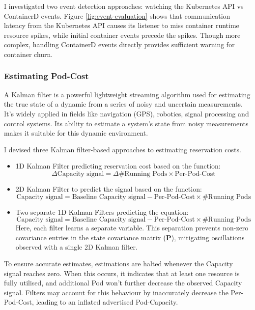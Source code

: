 I investigated two event detection approaches: watching the Kubernetes API vs
ContainerD events. Figure \ref{fig:event-evaluation} shows that communication
latency from the Kubernetes API causes its listener to miss container runtime
resource spikes, while initial container events precede the spikes. Though more
complex, handling ContainerD events directly provides sufficient warning for
container churn.

\subsubsection{Estimating Pod-Cost}
\label{sec:estimating-cost}
A Kalman filter \cite{welch1995introduction} is a powerful lightweight streaming algorithm used for
estimating the true state of a dynamic from a series of noisy and uncertain
measurements. It's widely applied in fields like navigation (GPS), robotics,
signal processing and control systems. Its ability to estimate a system's state
from noisy measurements makes it suitable for this dynamic environment.

I devised three Kalman filter-based approaches to estimating reservation costs.
\begin{itemize}
    \item 1D Kalman Filter predicting reservation cost based on the function:
        \[\Delta \text{Capacity signal} = \Delta \text{\# Running Pods} \times
        \text{Per-Pod-Cost}\]
    \item 2D Kalman Filter to predict the signal based on the function:
        \[\text{Capacity signal} = \text{Baseline Capacity signal} - \text{Per-Pod-Cost}
        \times \text{\# Running Pods}\]
    \item Two separate 1D Kalman Filters predicting the equation:
        \[\text{Capacity signal} = \text{Baseline Capacity signal} -
        \text{Per-Pod-Cost} \times \text{\# Running Pods}\]
        Here, each filter learns a separate variable. This separation prevents
        non-zero covariance entries in the state covariance matrix ($\mathbf{P}$),
        mitigating oscillations observed with a single 2D Kalman filter.
\end{itemize}
To ensure accurate estimates, estimations are halted whenever the Capacity signal
reaches zero. When this occurs, it indicates that at least one resource is fully
utilised, and additional Pod won't further decrease the observed Capacity
signal. Filters may account for this behaviour by inaccurately decrease the
Per-Pod-Cost, leading to an inflated advertised Pod-Capacity.


